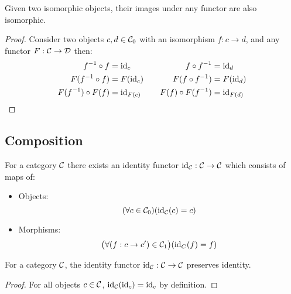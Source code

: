 \begin{theorem}
  Given two isomorphic objects, their images under any functor are also
  isomorphic.

  \begin{proof}
    Consider two objects $c,d \in \mathcal{C}_0$ with an isomorphism $f: c\to d$, and any
    functor $F:\mathcal{C} \to \mathcal{D}$ then:
    \[
      \begin{aligned}
        f^{-1}\circ f &= \mathrm{id}_c\\
        F(f^{-1}\circ f) &= F(\mathrm{id}_c)\\
        F(f^{-1})\circ F(f) &= \mathrm{id}_{F(c)}
      \end{aligned}
      \qquad
      \begin{aligned}
        f \circ f^{-1} &= \mathrm{id}_d\\
        F(f \circ f^{-1}) &= F(\mathrm{id}_d)\\
        F(f) \circ F(f^{-1}) &= \mathrm{id}_{F(d)}
      \end{aligned}
    \]
  \end{proof}
\end{theorem}

\subsection{Composition}
\begin{definition} For a category $\mathcal{C}$ there exists an identity
  functor $\mathrm{id}_{\mathcal{C}}: \mathcal{C} \to \mathcal{C}$ which consists of maps of:
  \parencite{adamek_herrlich_strecker:joy_cats}
  \begin{itemize}
    \item Objects:
      \[(\forall c \in \mathcal{C}_0)
        (\mathrm{id}_{\mathcal{C}}(c) = c)\]
    \item Morphisms:
      \[\big(\forall (f: c\to c') \in \mathcal{C}_1\big)
        (\mathrm{id}_C(f) = f)\]
  \end{itemize}
\end{definition}

\begin{theorem}
  For a category $\mathcal{C}$, the identity functor $\mathrm{id}_{\mathcal{C}}: \mathcal{C} \to \mathcal{C}$ preserves
  identity.

  \begin{proof}
    For all objects $c\in \mathcal{C}$, $\mathrm{id}_{\mathcal{C}}(\mathrm{id}_c) = \mathrm{id}_c$ by definition.
  \end{proof}
\end{theorem}

